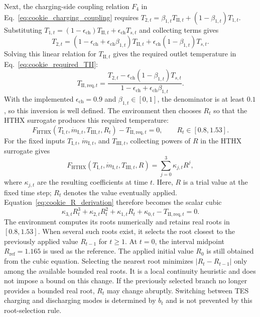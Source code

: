 \documentclass[12pt]{article}
\begin{document}
Next, the charging-side coupling relation $F_4$ in
Eq.~\eqref{eq:cookie_charging_coupling} requires
$T_{2,t}=\beta_{1,t}T_{\mathrm{II},t}+(1-\beta_{1,t})T_{1,t}$.
Substituting
$T_{1,t}=(1-\epsilon_{\mathrm{ch}})T_{\mathrm{II},t}
+\epsilon_{\mathrm{ch}}T_{s,t}$ and collecting terms gives
\[
T_{2,t}=
(1-\epsilon_{\mathrm{ch}}+\epsilon_{\mathrm{ch}}\beta_{1,t})
T_{\mathrm{II},t}
+\epsilon_{\mathrm{ch}}(1-\beta_{1,t})T_{s,t}.
\]
Solving this linear relation for $T_{\mathrm{II},t}$ gives the required
outlet temperature in Eq.~\eqref{eq:cookie_required_TII}:
\begin{equation}
T_{\mathrm{II,req},t}=
\frac{T_{2,t}-\epsilon_{\mathrm{ch}}(1-\beta_{1,t})T_{s,t}}
{1-\epsilon_{\mathrm{ch}}+\epsilon_{\mathrm{ch}}\beta_{1,t}}.
\label{eq:cookie_required_TII}
\end{equation}
With the implemented $\epsilon_{\mathrm{ch}}=0.9$ and
$\beta_{1,t}\in[0,1]$, the denominator is at least $0.1$, so this inversion
is well defined. The environment then chooses $R_t$ so that the HTHX
surrogate produces this required temperature:
\begin{equation}
F_{\mathrm{HTHX}}\!\left(
T_{\mathrm{I},t},\dot{m}_{\mathrm{I},t},T_{\mathrm{III},t},R_t
\right)-T_{\mathrm{II,req},t}=0,
\qquad R_t\in[0.8,1.53].
\label{eq:cookie_R_derivation}
\end{equation}
For the fixed inputs $T_{\mathrm{I},t}$, $\dot{m}_{\mathrm{I},t}$, and
$T_{\mathrm{III},t}$, collecting powers of $R$ in the HTHX surrogate gives
\[
F_{\mathrm{HTHX}}(T_{\mathrm{I},t},\dot{m}_{\mathrm{I},t},T_{\mathrm{III},t},R)
=\sum_{j=0}^{3}\kappa_{j,t}R^j,
\]
where $\kappa_{j,t}$ are the resulting coefficients at time $t$.
Here, $R$ is a trial value at the fixed time step; $R_t$ denotes the value
eventually applied.
Equation~\eqref{eq:cookie_R_derivation} therefore becomes the scalar cubic
\[
\kappa_{3,t}R_t^3+\kappa_{2,t}R_t^2+\kappa_{1,t}R_t
+\kappa_{0,t}-T_{\mathrm{II,req},t}=0.
\]
The environment computes its roots numerically and retains real roots in
$[0.8,1.53]$. When several such roots exist, it selects the root closest to
the previously applied value $R_{t-1}$ for $t\geq1$. At $t=0$, the interval
midpoint $R_{\mathrm{ref}}=1.165$ is used as the reference.
The applied initial value $R_0$ is still obtained from the cubic equation.
Selecting the nearest root minimizes $|R_t-R_{t-1}|$ only among the
available bounded real roots. It is a local continuity heuristic and does
not impose a bound on this change. If the previously selected branch no
longer provides a bounded real root, $R_t$ may change abruptly. Switching
between TES charging and discharging modes is determined by $b_t$ and is
not prevented by this root-selection rule.
\end{document}
